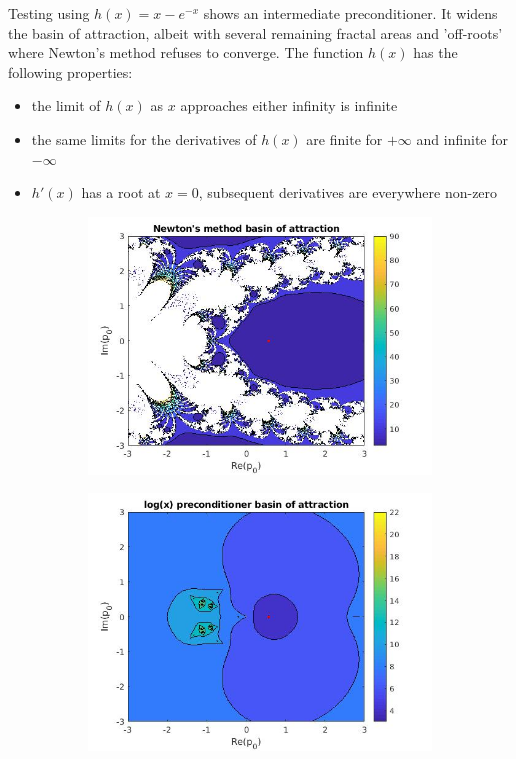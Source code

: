 \documentclass{book}
\begin{document}
Testing using $h(x) = x - e^{-x}$ shows an intermediate preconditioner.
It widens the basin of attraction, albeit with several remaining fractal areas and 'off-roots' where Newton's method refuses to converge.
The function $h(x)$ has the following properties:
\begin{itemize}
\item the limit of $h(x)$ as $x$ approaches either infinity is infinite
\item the same limits for the derivatives of $h(x)$ are finite for $+ \infty$ and infinite for $-\infty$
\item $h'(x)$ has a root at $x=0$, subsequent derivatives are everywhere non-zero
\end{itemize}

\begin{figure}
	\begin{subfigure}{0.5\textwidth}
		\includegraphics[width=\textwidth]{exp1_01.jpg}
	\end{subfigure}
	\begin{subfigure}{0.5\textwidth}
		\includegraphics[width=\textwidth]{exp1_02.jpg}
	\end{subfigure}
\end{figure}
\end{document}
